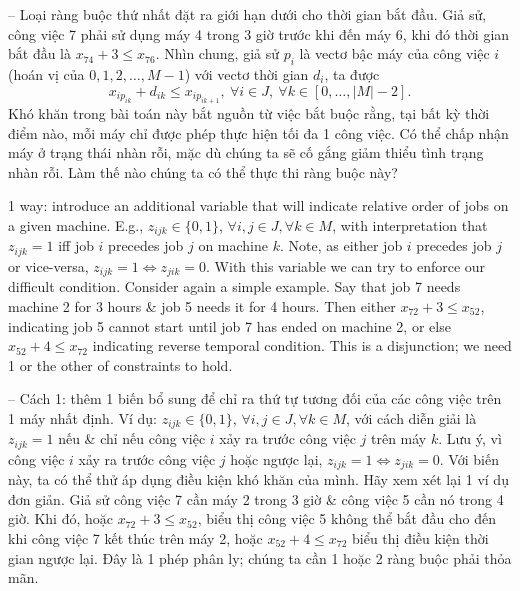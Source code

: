 \documentclass{article}
\begin{document}
\begin{itemize}
\begin{itemize}
\begin{itemize}
            -- Loại ràng buộc thứ nhất đặt ra giới hạn dưới cho thời gian bắt đầu. Giả sử, công việc 7 phải sử dụng máy 4 trong 3 giờ trước khi đến máy 6, khi đó thời gian bắt đầu là $x_{74} + 3\le x_{76}$. Nhìn chung, giả sử $p_i$ là vectơ bậc máy của công việc $i$ (hoán vị của $0,1,2,\ldots,M - 1$) với vectơ thời gian $d_i$, ta được
            \begin{equation*}
                x_{ip_{ik}} + d_{ik}\le x_{ip_{ik + 1}},\ \forall i\in J,\ \forall k\in[0,\ldots,|M| - 2].
            \end{equation*}
            Khó khăn trong bài toán này bắt nguồn từ việc bắt buộc rằng, tại bất kỳ thời điểm nào, mỗi máy chỉ được phép thực hiện tối đa 1 công việc. Có thể chấp nhận máy ở trạng thái nhàn rỗi, mặc dù chúng ta sẽ cố gắng giảm thiểu tình trạng nhàn rỗi. Làm thế nào chúng ta có thể thực thi ràng buộc này?

            1 way: introduce an additional variable that will indicate relative order of jobs on a given machine. E.g., $z_{ijk}\in\{0,1\}$, $\forall i,j\in J,\forall k\in M$, with interpretation that $z_{ijk} = 1$ iff job $i$ precedes job $j$ on machine $k$. Note, as either job $i$ precedes job $j$ or vice-versa, $z_{ijk} = 1\Leftrightarrow z_{jik} = 0$. With this variable we can try to enforce our difficult condition. Consider again a simple example. Say that job 7 needs machine 2 for 3 hours \& job 5 needs it for 4 hours. Then either $x_{72} + 3\le x_{52}$, indicating job 5 cannot start until job 7 has ended on machine 2, or else $x_{52} + 4\le x_{72}$ indicating reverse temporal condition. This is a disjunction; we need 1 or the other of constraints to hold.

            -- Cách 1: thêm 1 biến bổ sung để chỉ ra thứ tự tương đối của các công việc trên 1 máy nhất định. Ví dụ: $z_{ijk}\in\{0,1\}$, $\forall i,j\in J,\forall k\in M$, với cách diễn giải là $z_{ijk} = 1$ nếu \& chỉ nếu công việc $i$ xảy ra trước công việc $j$ trên máy $k$. Lưu ý, vì công việc $i$ xảy ra trước công việc $j$ hoặc ngược lại, $z_{ijk} = 1\Leftrightarrow z_{jik} = 0$. Với biến này, ta có thể thử áp dụng điều kiện khó khăn của mình. Hãy xem xét lại 1 ví dụ đơn giản. Giả sử công việc 7 cần máy 2 trong 3 giờ \& công việc 5 cần nó trong 4 giờ. Khi đó, hoặc $x_{72} + 3\le x_{52}$, biểu thị công việc 5 không thể bắt đầu cho đến khi công việc 7 kết thúc trên máy 2, hoặc $x_{52} + 4\le x_{72}$ biểu thị điều kiện thời gian ngược lại. Đây là 1 phép phân ly; chúng ta cần 1 hoặc 2 ràng buộc phải thỏa mãn.


\end{itemize}
\end{itemize}
\end{itemize}
\end{document}
